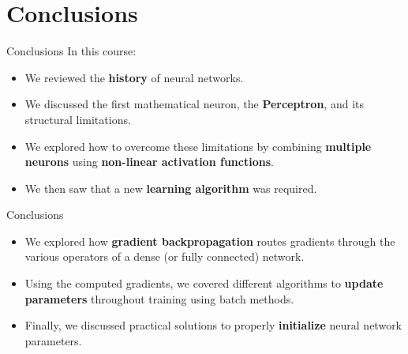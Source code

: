 \section{Conclusions}

\begin{frame}{Conclusions}
	In this course:
	\begin{itemize}
		\item We reviewed the \textbf{history} of neural networks.
		\pause
		\item We discussed the first mathematical neuron, the \textbf{Perceptron}, and its structural limitations.
		\pause
		\item We explored how to overcome these limitations by combining \textbf{multiple neurons} using \textbf{non-linear activation functions}.
		\pause
		\item We then saw that a new \textbf{learning algorithm} was required.
	\end{itemize}
\end{frame}

\begin{frame}{Conclusions}
	\begin{itemize}
		\item We explored how \textbf{gradient backpropagation} routes gradients through the various operators of a dense (or fully connected) network.
		\pause
		\item Using the computed gradients, we covered different algorithms to \textbf{update parameters} throughout training using batch methods.
		\pause
		\item Finally, we discussed practical solutions to properly \textbf{initialize} neural network parameters.
	\end{itemize}
\end{frame}